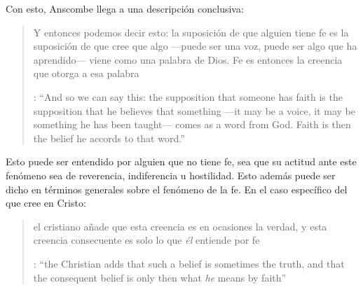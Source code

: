 Con esto, Anscombe llega a una descripción conclusiva: \blockquote[{\cite[119-120]{anscombe1981erp:faith}}: \enquote{And so we can say this: the supposition that someone has faith is the supposition that he believes that something ---it may be a voice, it may be something he has been taught--- comes as a word from God. Faith is then the belief he accords to that word.}]{Y entonces podemos decir esto: la suposición de que alguien tiene fe es la suposición de que cree que algo ---puede ser una voz, puede ser algo que ha aprendido--- viene como una palabra de Dios. Fe es entonces la creencia que otorga a esa palabra}. Esto puede ser entendido por alguien que no tiene fe, sea que su actitud ante este fenómeno sea de reverencia, indiferencia u hostilidad. Esto además puede ser dicho en términos generales sobre el fenómeno de la fe. En el caso específico del que cree en Cristo: \blockquote[{\cite[120]{anscombe1981erp:faith}}: \enquote{the Christian adds that such a belief is sometimes the truth, and that the consequent belief is only then what \emph{he} means by faith}]{el cristiano añade que esta creencia es en ocasiones la verdad, y esta creencia consecuente es solo lo que \emph{él} entiende por fe}.
